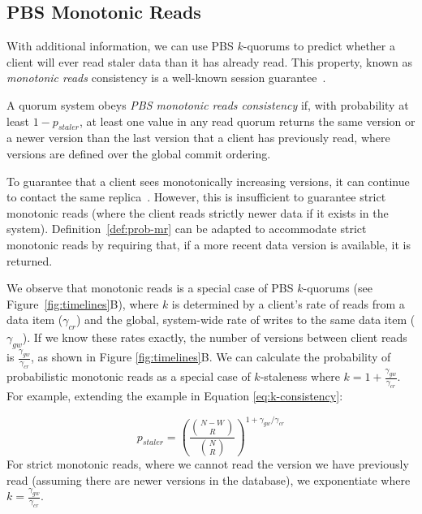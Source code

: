 \documentclass{vldb}
\begin{document}
\subsection{PBS Monotonic Reads}

With additional information, we can use PBS $k$-quorums to predict
whether a client will ever read staler data than it has already read.
This property, known as \textit{monotonic reads} consistency is a
well-known session guarantee~\cite{sessionguarantees}.

\begin{definition}
\label{def:prob-mr}
A quorum system obeys \textit{PBS monotonic reads consistency} if,
with probability at least $1-p_{staler}$, at least one value in any
read quorum returns the same version or a newer version than the last
version that a client has previously read, where versions are defined
over the global commit ordering.
\end{definition}

To guarantee that a client sees monotonically increasing versions, it
can continue to contact the same replica~\cite{vogels-defs}.  However,
this is insufficient to guarantee strict monotonic reads (where the
client reads strictly newer data if it exists in the system).
Definition~\ref{def:prob-mr} can be adapted to accommodate strict
monotonic reads by requiring that, if a more recent data version is
available, it is returned.

We observe that monotonic reads is a special case of PBS $k$-quorums
(see Figure~\ref{fig:timelines}B), where $k$ is determined by a
client's rate of reads from a data item ($\gamma_{cr}$) and the
global, system-wide rate of writes to the same data item
($\gamma_{gw}$).  If we know these rates exactly, the number of
versions between client reads is $\frac{\gamma_{gw}}{\gamma_{cr}}$, as
shown in Figure \ref{fig:timelines}B.  We can calculate the
probability of probabilistic monotonic reads as a special case of
$k$-staleness where $k=1+\frac{\gamma_{gw}}{\gamma_{cr}}$.  For
example, extending the example in Equation \ref{eq:k-consistency}:

\begin{equation}
\label{eq:prob-mr}
p_{staler} = \left(\frac{{N-W \choose R}}{{N \choose R}}\right)^{1+\gamma_{gw}/\gamma_{cr}}
\end{equation}
For strict monotonic reads, where we cannot read the version we have
previously read (assuming there are newer versions in the database),
we exponentiate where $k=\frac{\gamma_{gw}}{\gamma_{cr}}$.  
\end{document}
